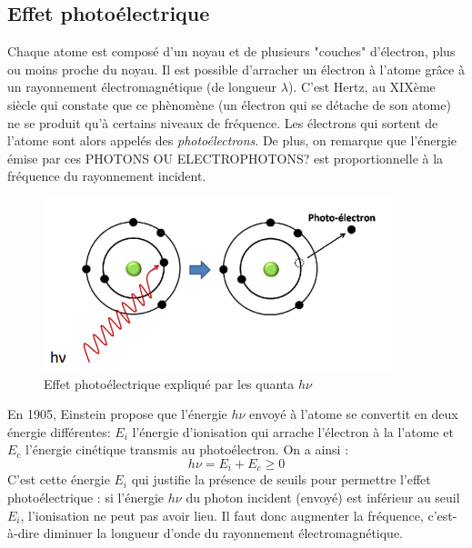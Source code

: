 \documentclass{article}
\begin{document}
\subsection{Effet photoélectrique}
\indent Chaque atome est composé d'un noyau et de plusieurs "couches" d'électron, plus ou moins proche du noyau. Il est possible d'arracher un électron à l'atome grâce à un rayonnement électromagnétique (de longueur $\lambda$).\newline
\indent C'est Hertz, au XIXème siècle qui constate que ce phènomène (un électron qui se détache de son atome) ne se produit qu'à certains niveaux de fréquence. Les électrons qui sortent de l'atome sont alors appelés des \textit{photoélectrons}. De plus, on remarque que l'énergie émise par ces PHOTONS OU ELECTROPHOTONS? est proportionnelle à la fréquence du rayonnement incident.\newline
\begin{figure}[h]
    \centering
    \includegraphics[scale=0.5]{photoelectrique.png}
    \caption{Effet photoélectrique expliqué par les quanta $h\nu$}
\end{figure}
\newline
En 1905, Einstein propose que l'énergie $h\nu$ envoyé à l'atome se convertit en deux énergie différentes: $E_{i}$ l'énergie d'ionisation qui arrache l'électron à la l'atome et $E_{c}$ l'énergie cinétique transmis au photoélectron. On a ainsi : \[ h\nu = E_{i}+E_{c} \geqslant 0 \]
C'est cette énergie $E_{i}$ qui justifie la présence de seuils pour permettre l'effet photoélectrique : si l'énergie $h\nu$ du photon incident (envoyé) est inférieur au seuil $E_{i}$, l'ionisation ne peut pas avoir lieu. Il faut donc augmenter la fréquence, c'est-à-dire diminuer la longueur d'onde du rayonnement électromagnétique.
\newpage
\end{document}

